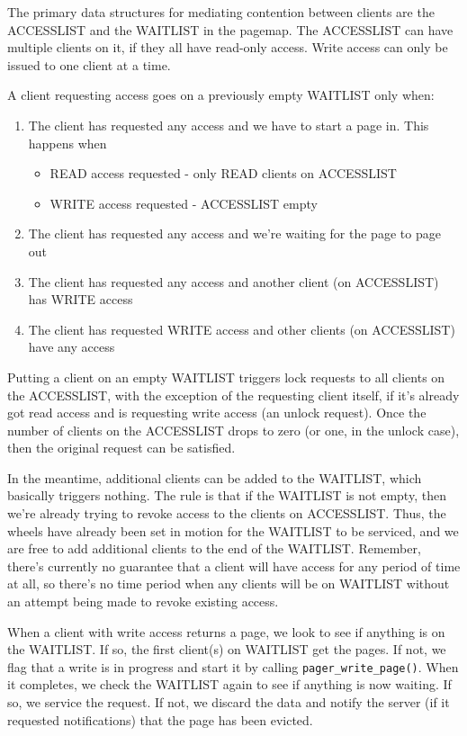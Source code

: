 \documentclass{article}
\def\pagerwritepage{{\tt pager_write_page()}\xspace}
\begin{document}
The primary data structures for mediating contention between clients
are the ACCESSLIST and the WAITLIST in the pagemap.  The ACCESSLIST
can have multiple clients on it, if they all have read-only access.
Write access can only be issued to one client at a time.

A client requesting access goes on a previously empty WAITLIST only when:
\begin{enumerate}[noitemsep, itemsep=2pt, topsep=0pt]
\item The client has requested any access and we have to start a page in.  This happens when
  \begin{itemize}[label={}]
  \item READ access requested - only READ clients on ACCESSLIST
  \item WRITE access requested - ACCESSLIST empty
  \end{itemize}
\item The client has requested any access and we're waiting for the page to page out
\item The client has requested any access and another client (on ACCESSLIST) has WRITE access
\item The client has requested WRITE access and other clients (on ACCESSLIST) have any access
\end{enumerate}

Putting a client on an empty WAITLIST triggers lock requests to all
clients on the ACCESSLIST, with the exception of the requesting client
itself, if it's already got read access and is requesting write access
(an unlock request).  Once the number of clients on the ACCESSLIST
drops to zero (or one, in the unlock case), then the original request
can be satisfied.

In the meantime, additional clients can be added to the WAITLIST,
which basically triggers nothing.  The rule is that if the WAITLIST is
not empty, then we're already trying to revoke access to the clients
on ACCESSLIST.  Thus, the wheels have already been set in motion for
the WAITLIST to be serviced, and we are free to add additional clients
to the end of the WAITLIST.  Remember, there's currently no guarantee
that a client will have access for any period of time at all, so
there's no time period when any clients will be on WAITLIST without an
attempt being made to revoke existing access.

When a client with write access returns a page, we look to see if
anything is on the WAITLIST.  If so, the first client(s) on WAITLIST
get the pages.  If not, we flag that a write is in progress and start
it by calling \pagerwritepage.  When it completes, we check the
WAITLIST again to see if anything is now waiting.  If so, we service
the request.  If not, we discard the data and notify the server (if
it requested notifications) that the page has been evicted.
\end{document}

